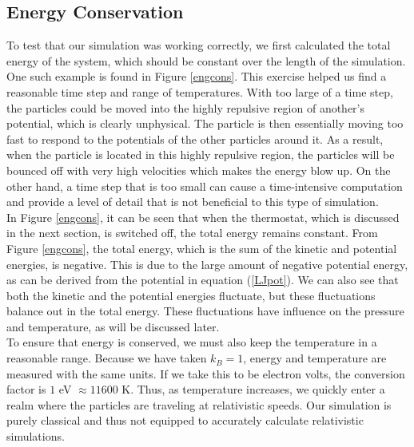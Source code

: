 \documentclass{article}
\begin{document}
\begin{multicols}{2}
\subsection{Energy Conservation}

To test that our simulation was working correctly, we first calculated the total energy of the system, which should be constant over the length of the simulation.  One such example is found in Figure \ref{engcons}.  This exercise helped us find a reasonable time step and range of temperatures.  With too large of a time step, the particles could be moved into the highly repulsive region of another's potential, which is clearly unphysical. The particle is then essentially moving too fast to respond to the potentials of the other particles around it. As a result, when the particle is located in this highly repulsive region, the particles will be bounced off with very high velocities which makes the energy blow up. On the other hand, a time step that is too small can cause a time-intensive computation and provide a level of detail that is not beneficial to this type of simulation. \\

In Figure \ref{engcons}, it can be seen that when the thermostat, which is discussed in the next section, is switched off, the total energy remains constant.  From Figure \ref{engcons}, the total energy, which is the sum of the kinetic and potential energies, is negative.  This is due to the large amount of negative potential energy, as can be derived from the potential in equation (\ref{LJpot}).   We can also see that both the kinetic and the potential energies fluctuate, but these fluctuations balance out in the total energy. These fluctuations have influence on the pressure and temperature, as will be discussed later.\\

To ensure that energy is conserved, we must also keep the temperature in a reasonable range.  Because we have taken $k_B =1$, energy and temperature are measured with the same units.  If we take this to be electron volts, the conversion factor is $1 $ eV $\approx 11600$ K.  Thus, as temperature increases, we quickly enter a realm where the particles are traveling at relativistic speeds.  Our simulation is purely classical and thus not equipped to accurately calculate relativistic simulations.


\end{multicols}
\end{document}
